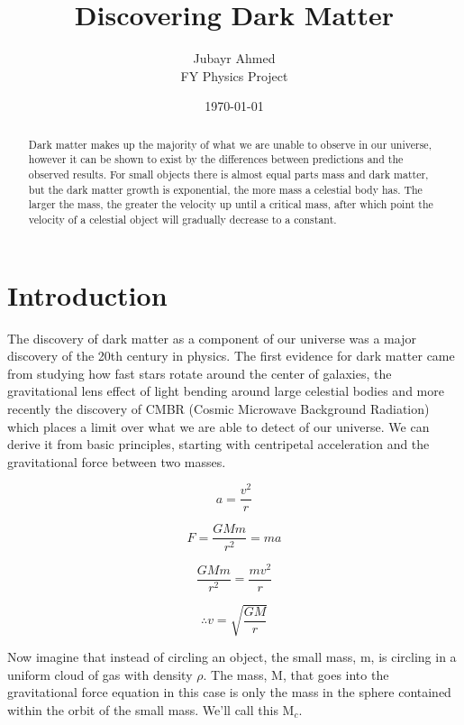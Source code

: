 \documentclass[10pt, twocolumn, twoside]{article}
\author{Jubayr Ahmed\\FY Physics Project}
\title{Discovering Dark Matter}
\date{\today}
\begin{document}
\maketitle %

\begin{abstract}
Dark matter makes up the majority of what we are unable to observe in our universe, however it can be shown to exist by the differences between predictions and the observed results. For small objects there is almost equal parts mass and dark matter, but the dark matter growth is exponential, the more mass a celestial body has. The larger the mass, the greater the velocity up until a critical mass, after which point the velocity of a celestial object will gradually decrease to a constant.
\end{abstract}

\section{Introduction}
The discovery of dark matter as a component of our universe was a major discovery of the 20th century in physics. The first evidence for dark matter came from studying how fast stars rotate around the center of galaxies, the gravitational lens effect of light bending around large celestial bodies and more recently the discovery of CMBR (Cosmic Microwave Background Radiation) which places a limit over what we are able to detect of our universe. We can derive it from basic principles, starting with centripetal acceleration and the gravitational force between two masses.

\begin{equation}
a = \frac{v^2}{r}
\end{equation}

\begin{equation}
F = \frac{G M m}{r^2} = ma
\end{equation}

\begin{equation}
\frac{G M m}{r^2}=\frac{m v^2}{r}
\end{equation}

\begin{equation}
\therefore v = \sqrt{\frac{GM}{r}}
\end{equation}

Now imagine that instead of circling an object, the small mass, m, is circling in a uniform cloud of gas with density $\rho$. The mass, M, that goes into the gravitational force equation in this case is only the mass in the sphere contained within the orbit of the small mass. We’ll call this M$_c$.
\end{document}
